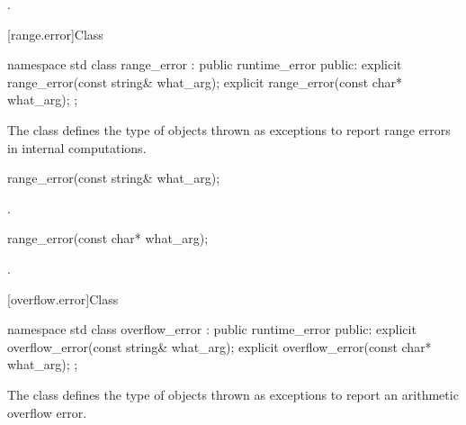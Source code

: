 \begin{itemdescr}

\pnum
\ensures
{}.
\end{itemdescr}

[range.error]{Class }

%
\begin{codeblock}
namespace std {
  class range_error : public runtime_error {
  public:
    explicit range_error(const string& what_arg);
    explicit range_error(const char* what_arg);
  };
}
\end{codeblock}

\pnum
The class
defines the type of objects thrown as exceptions to report range errors
in internal computations.

%
\begin{itemdecl}
range_error(const string& what_arg);
\end{itemdecl}

\begin{itemdescr}

\pnum
\ensures
{}.
\end{itemdescr}

%
\begin{itemdecl}
range_error(const char* what_arg);
\end{itemdecl}

\begin{itemdescr}

\pnum
\ensures
{}.
\end{itemdescr}

[overflow.error]{Class }

%
\begin{codeblock}
namespace std {
  class overflow_error : public runtime_error {
  public:
    explicit overflow_error(const string& what_arg);
    explicit overflow_error(const char* what_arg);
  };
}
\end{codeblock}

\pnum
The class
defines the type of objects thrown as exceptions to report an arithmetic overflow error.

